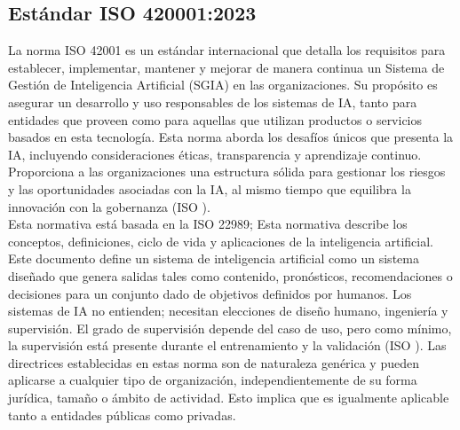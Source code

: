 \subsection{Estándar ISO 420001:2023}
La norma ISO 42001 es un estándar internacional que detalla los requisitos para establecer, implementar, mantener y mejorar de manera continua un Sistema de Gestión de Inteligencia Artificial (SGIA) en las organizaciones. Su propósito es asegurar un desarrollo y uso responsables de los sistemas de IA, tanto para entidades que proveen como para aquellas que utilizan productos o servicios basados en esta tecnología. Esta norma aborda los desafíos únicos que presenta la IA, incluyendo consideraciones éticas, transparencia y aprendizaje continuo. Proporciona a las organizaciones una estructura sólida para gestionar los riesgos y las oportunidades asociadas con la IA, al mismo tiempo que equilibra la innovación con la gobernanza (ISO \citeyear{iso42001}).\\
Esta normativa está basada en la ISO 22989; Esta normativa describe los conceptos, definiciones, ciclo de vida y aplicaciones de la inteligencia artificial. Este documento define un sistema de inteligencia artificial como un sistema diseñado que genera salidas tales como contenido, pronósticos, recomendaciones o decisiones para un conjunto dado de objetivos definidos por humanos. Los sistemas de IA no entienden; necesitan elecciones de diseño humano, ingeniería y supervisión. El grado de supervisión depende del caso de uso, pero como mínimo, la supervisión está presente durante el entrenamiento y la validación (ISO \citeyear{iso22989}).
Las directrices establecidas en estas norma son de naturaleza genérica y pueden aplicarse a cualquier tipo de organización, independientemente de su forma jurídica, tamaño o ámbito de actividad. Esto implica que es igualmente aplicable tanto a entidades públicas como privadas.

